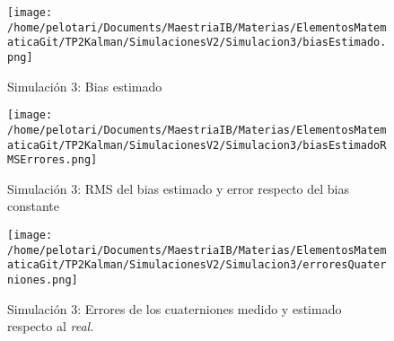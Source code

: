 \documentclass[a4paper,11pt,twoside]{IT-CNEA}
\begin{document}
\begin{figure}[h!]
\centering
\texttt{[image: /home/pelotari/Documents/MaestriaIB/Materias/ElementosMatematicaGit/TP2Kalman/SimulacionesV2/Simulacion3/biasEstimado.png]}
\caption{Simulación 3:  Bias estimado}
\label{fig:Simulacion3/biasEstimado}
\end{figure}
\begin{figure}[h!]
\centering
\texttt{[image: /home/pelotari/Documents/MaestriaIB/Materias/ElementosMatematicaGit/TP2Kalman/SimulacionesV2/Simulacion3/biasEstimadoRMSErrores.png]}
\caption{Simulación 3:  RMS del bias estimado y error respecto del bias constante}
\label{fig:Simulacion3/biasEstimadoRMSErrores}
\end{figure}
\begin{figure}[h!]
\centering
\texttt{[image: /home/pelotari/Documents/MaestriaIB/Materias/ElementosMatematicaGit/TP2Kalman/SimulacionesV2/Simulacion3/erroresQuaterniones.png]}
\caption{Simulación 3:  Errores de los cuaterniones medido y estimado respecto al \textit{real}.}
\label{fig:Simulacion3/erroresQuaterniones}
\end{figure}
\end{document}
